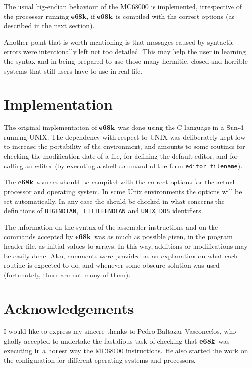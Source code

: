 \documentclass[a4,11pt]{article}
\newcommand{\esek}{{\bf e68k}}
\begin{document}
The usual big-endian behaviour of the MC68000 is implemented,
irrespective of the processor running \esek, if \esek\  is compiled
with the correct options (as described in the next section).

Another point that is worth mentioning is that messages caused by
syntactic errors were intentionally left not too detailed. This may help
the user in learning the syntax and in being prepared to use those many
hermitic, closed and horrible systems that still users have to use in
real life.

\section{Implementation}

The original implementation of \esek\    was done using the C language
in a Sun-4 running
UNIX. The dependency with respect to UNIX was deliberately kept low
to increase the portability of the environment, and amounts to some
routines for checking the modification date of a file, for defining
the default editor, and for calling an editor (by executing a shell
command of the form {\tt editor filename}).

The \esek\  sources should be compiled with the correct options for the
actual processor and operating system. In some Unix environments the
options will be set automatically. In any case the 
should be checked in what concerns the definitions of {\tt BIGENDIAN}, {\tt
LITTLEENDIAN} and {\tt UNIX}, {\tt DOS} identifiers.

The information on the syntax of the assembler instructions and
on the commands accepted by \esek\    was as much
as possible given, in the program header file,  as initial values to arrays.
In this way, additions or modifications may be easily done. Also,
comments were provided as an explanation on what each routine is
expected to do, and whenever some obscure solution was used
(fortunately, there are not many of them).

\section{Acknowledgements}

I would like to express my sincere thanks to Pe\-dro Bal\-ta\-zar
Vas\-con\-ce\-los, who gladly accepted to undertake the fastidious
task of checking that \esek\    was executing in a honest way the
MC68000 instructions. He also started the work on the configuration
for different operating systems and processors.
\end{document}
